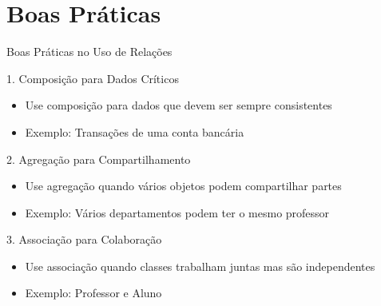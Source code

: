 \documentclass[aspectratio=169]{beamer}
\begin{document}
\section{Boas Práticas}

\begin{frame}{Boas Práticas no Uso de Relações}
\begin{block}{1. Composição para Dados Críticos}
\begin{itemize}
\item Use composição para dados que devem ser sempre consistentes
\item Exemplo: Transações de uma conta bancária
\end{itemize}
\end{block}

\begin{block}{2. Agregação para Compartilhamento}
\begin{itemize}
\item Use agregação quando vários objetos podem compartilhar partes
\item Exemplo: Vários departamentos podem ter o mesmo professor
\end{itemize}
\end{block}

\begin{block}{3. Associação para Colaboração}
\begin{itemize}
\item Use associação quando classes trabalham juntas mas são independentes
\item Exemplo: Professor e Aluno
\end{itemize}
\end{block}
\end{frame}
\end{document}
